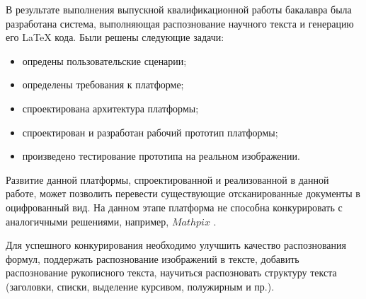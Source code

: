 \conclusion

В результате выполнения выпускной квалификационной работы бакалавра была разработана система, выполняющая распознование научного текста и генерацию его \LaTeX\; кода. Были решены следующие задачи:

\begin{itemize}
    \item опредены пользовательские сценарии;
    \item определены требования к платформе;
    \item спроектирована архитектура платформы;
    \item спроектирован и разработан рабочий прототип платформы;
    \item произведено тестирование прототипа на реальном изображении.
\end{itemize}

Развитие данной платформы, спроектированной и реализованной в данной работе, может позволить перевести существующие отсканированные документы в оцифрованный вид. На данном этапе платформа не способна конкурировать с аналогичными решениями, например, $Mathpix$ \cite{mathpix}.

Для успешного конкурирования необходимо улучшить качество распознования формул, поддержать распознование изображений в тексте, добавить распознование рукописного текста, научиться распозновать структуру текста (заголовки, списки, выделение курсивом, полужирным и пр.).